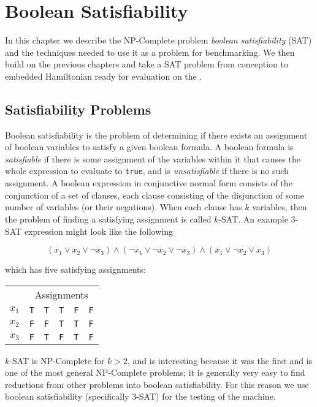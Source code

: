 \chapter{Boolean Satisfiability}
In this chapter we describe the NP-Complete problem \emph{boolean satisfiability} (SAT) and the techniques needed to use it as a problem for \machine benchmarking.  We then build on the previous chapters and take a SAT problem from conception to embedded Hamiltonian ready for evaluation on the \machine.

\section{Satisfiability Problems}
Boolean satisfiability is the problem of determining if there exists an assignment of boolean variables to satisfy a given boolean formula.  A boolean formula is \emph{satisfiable} if there is some assignment of the variables within it that causes the whole expression to evaluate to \texttt{true}, and is \emph{unsatisfiable} if there is no such assignment.  
A boolean expression in conjunctive normal form consists of the conjunction of a set of clauses, each clause consisting of the disjunction of some number of variables (or their negations).  When each clause has $k$ variables, then the problem of finding a satisfying assignment is called $k$-SAT.  An example 3-SAT expression might look like the following

\begin{equation}
	(x_1 \vee x_2 \vee \neg x_3) \wedge (\neg x_1 \vee \neg x_2 \vee \neg x_3) \wedge (x_1 \vee \neg x_2 \vee x_3)
\end{equation}

which has five satisfying assignments:

\begin{center}
\begin{tabular}{l || l | l | l | l | l}
	\multicolumn{1}{l}{} & \multicolumn{5}{c}{Assignments} \\
	$x_1$ & \texttt{T} & \texttt{T} & \texttt{T} & \texttt{F} & \texttt{F} \\
	$x_2$ & \texttt{F} & \texttt{F} & \texttt{T} & \texttt{T} & \texttt{F} \\
	$x_3$ & \texttt{F} & \texttt{T} & \texttt{F} & \texttt{T} & \texttt{F} \\
\end{tabular}
\end{center}

$k$-SAT is NP-Complete\cite{sat} for $k > 2$, and is interesting because it was the first and is one of the most general NP-Complete problems; it is generally very easy to find reductions from other problems into boolean satisfiability.  For this reason we use boolean satisfiability (specifically 3-SAT) for the testing of the \machine machine.

